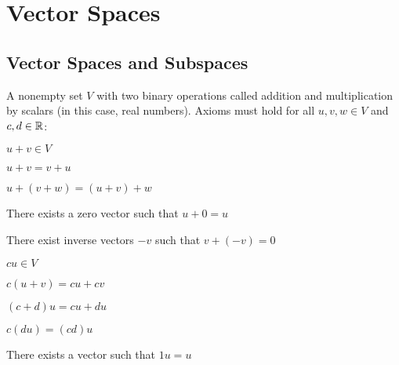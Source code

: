 \section{Vector Spaces}
\begin{outline}

\end{outline}

\begin{card}
    \subsection{Vector Spaces and Subspaces}

    \begin{theorem}
    A nonempty set $V$ with two binary operations called
    addition and multiplication by scalars (in this case, real numbers).
    Axioms must hold for all $u,v,w \in V$ and $c,d \in \mathbb{R}$:
    \begin{compactenum}
    \item $u + v \in V$
    \item $u + v = v + u$
    \item $u + (v + w) = (u + v) + w$
    \item There exists a zero vector such that $u + 0 = u$
    \item There exist inverse vectors $-v$ such that $v + (-v) = 0$
    \item $cu \in V$
    \item $c(u + v) = cu + cv$
    \item $(c + d)u = cu + du$
    \item $c(du) = (cd)u$
    \item There exists a vector such that $1u = u$
    \end{compactenum}
    \end{theorem}
    \end{card}

